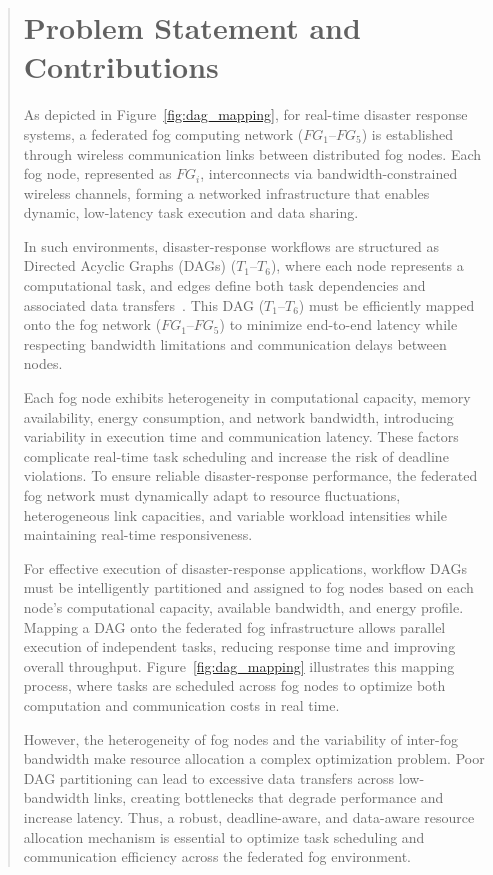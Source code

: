 \documentclass[conference]{IEEEtran}
\begin{document}
\begin{abstract}
\section{Problem Statement and Contributions}

As depicted in Figure~\ref{fig:dag_mapping}, for real-time disaster response systems, a federated fog computing network (\( FG_1 \)--\( FG_5 \)) is established through wireless communication links between distributed fog nodes. Each fog node, represented as \( FG_i \), interconnects via bandwidth-constrained wireless channels, forming a networked infrastructure that enables dynamic, low-latency task execution and data sharing.

In such environments, disaster-response workflows are structured as Directed Acyclic Graphs (DAGs) (\( T_1 \)--\( T_6 \)), where each node represents a computational task, and edges define both task dependencies and associated data transfers~\cite{dragoni2017microservices}. This DAG (\( T_1 \)--\( T_6 \)) must be efficiently mapped onto the fog network (\( FG_1 \)--\( FG_5 \)) to minimize end-to-end latency while respecting bandwidth limitations and communication delays between nodes.

Each fog node exhibits heterogeneity in computational capacity, memory availability, energy consumption, and network bandwidth, introducing variability in execution time and communication latency. These factors complicate real-time task scheduling and increase the risk of deadline violations. To ensure reliable disaster-response performance, the federated fog network must dynamically adapt to resource fluctuations, heterogeneous link capacities, and variable workload intensities while maintaining real-time responsiveness.

For effective execution of disaster-response applications, workflow DAGs must be intelligently partitioned and assigned to fog nodes based on each node’s computational capacity, available bandwidth, and energy profile. Mapping a DAG onto the federated fog infrastructure allows parallel execution of independent tasks, reducing response time and improving overall throughput. Figure~\ref{fig:dag_mapping} illustrates this mapping process, where tasks are scheduled across fog nodes to optimize both computation and communication costs in real time.

However, the heterogeneity of fog nodes and the variability of inter-fog bandwidth make resource allocation a complex optimization problem. Poor DAG partitioning can lead to excessive data transfers across low-bandwidth links, creating bottlenecks that degrade performance and increase latency. Thus, a robust, deadline-aware, and data-aware resource allocation mechanism is essential to optimize task scheduling and communication efficiency across the federated fog environment.


\end{abstract}
\end{document}
